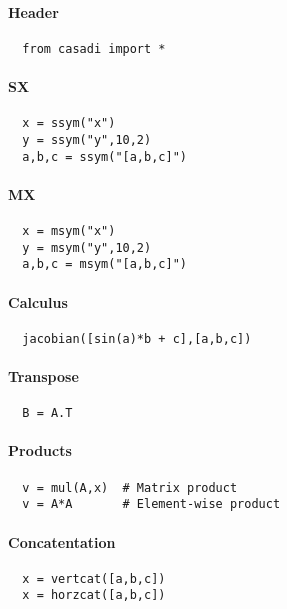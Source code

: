 \documentclass[a4paper,8pt,twocolumn]{article}
\begin{document}
\paragraph{Header}
\begin{verbatim}
  from casadi import *
\end{verbatim}

\paragraph{SX}
\begin{verbatim}
  x = ssym("x")
  y = ssym("y",10,2)
  a,b,c = ssym("[a,b,c]")
\end{verbatim}

\paragraph{MX}
\begin{verbatim}
  x = msym("x")
  y = msym("y",10,2)
  a,b,c = msym("[a,b,c]")
\end{verbatim}

\paragraph{Calculus}
\begin{verbatim}
  jacobian([sin(a)*b + c],[a,b,c])
\end{verbatim}

\paragraph{Transpose}
\begin{verbatim}
  B = A.T
\end{verbatim}

\paragraph{Products}
\begin{verbatim}
  v = mul(A,x)  # Matrix product
  v = A*A       # Element-wise product
\end{verbatim}

\paragraph{Concatentation}
\begin{verbatim}
  x = vertcat([a,b,c])
  x = horzcat([a,b,c])
\end{verbatim}
\end{document}
